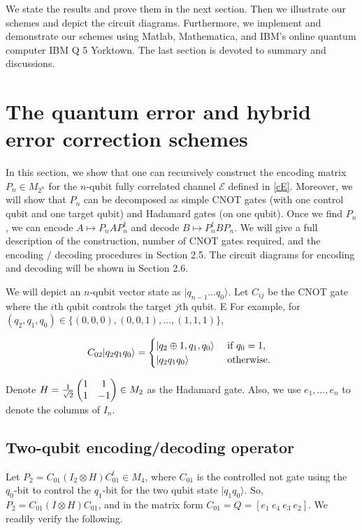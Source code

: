 \documentclass[11pt]{article}
\def\cE{{\mathcal E}}
\def\ra{{\rangle}}
\begin{document}
We state the results and prove them in
the next section. Then we illustrate our schemes and depict the 
circuit diagrams.
Furthermore, we implement and demonstrate our schemes
using Matlab, Mathematica, and IBM's online quantum computer IBM Q 5 Yorktown.
The last section is devoted to summary and discussions.


\section{The quantum error and hybrid error correction schemes}

In this section, we show that one can recursively construct the encoding matrix $P_n\in M_{2^n}$ 
for the $n$-qubit fully correlated channel $\cE$ defined in \ref{cE}.
Moreover, we will show that $P_n$ can be decomposed as simple CNOT gates
(with one control qubit and one target qubit)
and Hadamard gates (on one qubit). Once we find $P_n$, we can encode
$A \mapsto P_n A P_n^\dag$ and decode $B \mapsto P_n^\dag BP_n$.
We will give a full description of the construction, number of 
CNOT gates required, and the encoding / decoding procedures
in  Section 2.5. The circuit diagrams for encoding and decoding will be shown 
in Section 2.6.


We will depict  an $n$-qubit vector state as $|q_{n-1} \dots q_0\ra$. 
Let $C_{ij}$ be the CNOT gate where the $i$th qubit controls the target $j$th qubit. E
For example, for  $(q_2,q_1, q_0) \in 
\{ (0,0,0),(0,0,1), \dots, (1,1,1)\}$, 

$$C_{02}|q_2 q_1 q_0\ra = 
\begin{cases} |q_2\oplus 1, q_1, q_0\ra & \hbox{ if } q_0  = 1, \cr
|q_2 q_1 q_0\ra & \hbox{ otherwise. }\cr
\end{cases}$$

Denote $H = \frac{1}{\sqrt{2}} \begin{pmatrix} 1 & 1 \cr1 & -1\cr\end{pmatrix}
\in M_2$ as the Hadamard gate. Also, we use $e_1, \dots, e_n$ 
to denote the columns of $I_n$.

\subsection{Two-qubit encoding/decoding operator} 

Let $P_2 = C_{01} (I_2\otimes H)C_{01}^t\in M_4$,
where $C_{01}$ is the
controlled not gate using the 
$q_0$-bit to control the $q_1$-bit for the two qubit state 
$|q_1q_0\ra$.  So, $P_2 = C_{01}(I \otimes H)C_{01}$,
and in the matrix form 
$C_{01} = Q = [e_1 \ e_4 \ e_3 \ e_2].$ 
We readily verify the following.
\end{document}
